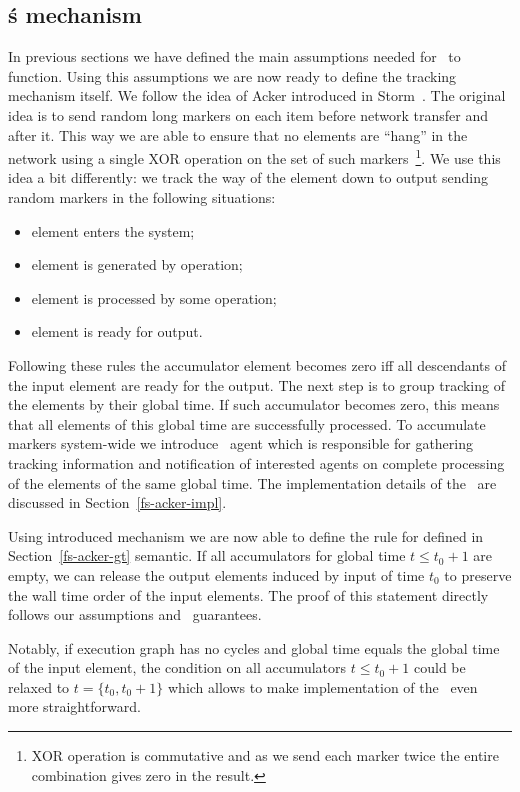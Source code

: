 \subsection{\tracker\'s mechanism}
In previous sections we have defined the main assumptions needed for \tracker\ to function. Using this assumptions we are now ready to define the tracking mechanism itself. We follow the idea of Acker introduced in Storm~\cite{Toshniwal:2014:STO:2588555.2595641}. The original idea is to send random long markers on each item before network transfer and after it. This way we are able to ensure that no elements are ``hang'' in the network using a single XOR operation on the set of such markers~\footnote{XOR operation is commutative and as we send each marker twice the entire combination gives zero in the result.}. We use this idea a bit differently: we track the way of the element down to output sending random markers in the following situations:
\begin{itemize}
    \item element enters the system;
    \item element is generated by operation;
    \item element is processed by some operation;
    \item element is ready for output.
\end{itemize}
Following these rules the accumulator element becomes zero iff all descendants of the input element are ready for the output. The next step is to group tracking of the elements by their global time. If such accumulator becomes zero, this means that all elements of this global time are successfully processed. To accumulate markers system-wide we introduce \tracker\ agent which is responsible for gathering tracking information and notification of interested agents on complete processing of the elements of the same global time. The implementation details of the \tracker\ are discussed in Section~\ref{fs-acker-impl}.

Using introduced mechanism we are now able to define the rule for defined in Section~\ref{fs-acker-gt} semantic. If all accumulators for global time $t \le t_0 + 1$ are empty, we can release the output elements induced by input of time $t_0$ to preserve the wall time order of the input elements. The proof of this statement directly follows our assumptions and \tracker\ guarantees.

Notably, if execution graph has no cycles and global time equals the global time of the input element, the condition on all accumulators $t \le t_0 + 1$ could be relaxed to $t = \{t_0, t_0 + 1\}$ which allows to make implementation of the \tracker\ even more straightforward.

